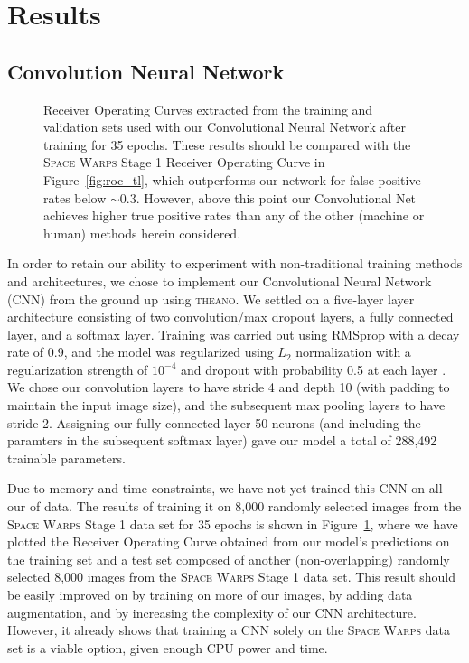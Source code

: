 \documentclass[10pt,twocolumn,letterpaper]{article}
\begin{document}
\section{Results}


\subsection{Convolution Neural Network}

\begin{figure}%
\centering
{}
\caption{Receiver Operating Curves extracted from the training and validation sets used with 
our Convolutional Neural Network after training for 35 epochs. These results should be compared 
with the \textsc{Space Warps} Stage 1 Receiver Operating Curve in Figure~\ref{fig:roc_tl}, which 
outperforms our network for false positive rates below $\sim 0.3$. However, above this 
point our Convolutional Net achieves higher true positive rates than any of the other (machine 
or human) methods herein considered.}
\label{fig:roc_theano}
\end{figure}


In order to retain our ability to experiment with non-traditional training methods and 
architectures, we chose to implement our Convolutional Neural Network (CNN) from the ground 
up using \textsc{theano}. We settled on a five-layer layer architecture consisting of two 
convolution/max dropout layers, a fully connected layer, and a softmax layer. Training was 
carried out using RMSprop with a decay rate of 0.9, and the model was regularized using $L_2$ normalization 
with a regularization strength of $10^{-4}$ and dropout with probability 0.5 at each layer . We chose our convolution layers to have stride 4 and 
depth 10 (with padding to maintain the input image size), and the subsequent max pooling layers to have stride 2. Assigning our fully 
connected layer 50 neurons (and including the paramters in the subsequent softmax layer) gave 
our model a total of 288,492 trainable parameters.

Due to memory and time constraints, we have not yet trained this CNN on all our of data. The results 
of training it on 8,000 randomly selected images from the \textsc{Space Warps} Stage 1 data set for 
35 epochs is shown in Figure~\ref{fig:roc_theano}, where we have plotted the Receiver Operating Curve 
obtained from our model's predictions on the training set and a test set composed of another (non-overlapping)
 randomly selected 8,000 images from the \textsc{Space Warps} Stage 1 data set. This result should be easily improved on by training on more of 
 our images, by adding data augmentation, and by increasing the complexity of our CNN architecture. However, it already shows that training 
 a CNN solely on the \textsc{Space Warps} data set is a viable option, given enough CPU power and time.
 
\end{document}
